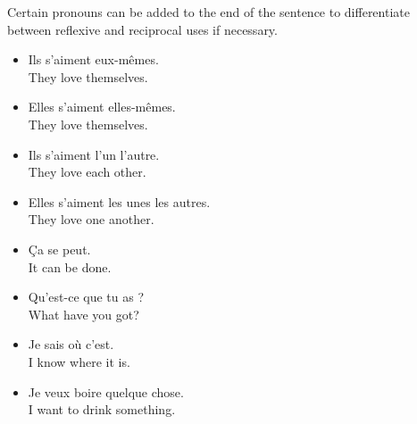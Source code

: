 Certain pronouns can be added to the end of the sentence to differentiate between reflexive and reciprocal uses if necessary.

\begin{itemize}
  \item  Ils s'aiment eux-m{\^e}mes. \\ They love themselves.
  \item  Elles s'aiment elles-m{\^e}mes. \\ They love themselves.
  \item  Ils s'aiment l'un l'autre. \\ They love each other.
  \item  Elles s'aiment les unes les autres. \\ They love one another.
\end{itemize}

\begin{itemize}
  \item  {\c C}a se peut. \\ It can be done.
  \item  Qu'est-ce que tu as ? \\ What have you got?
  \item  Je sais o{\`u} c'est. \\ I know where it is.
  \item  Je veux boire quelque chose. \\ I want to drink something.
\end{itemize}